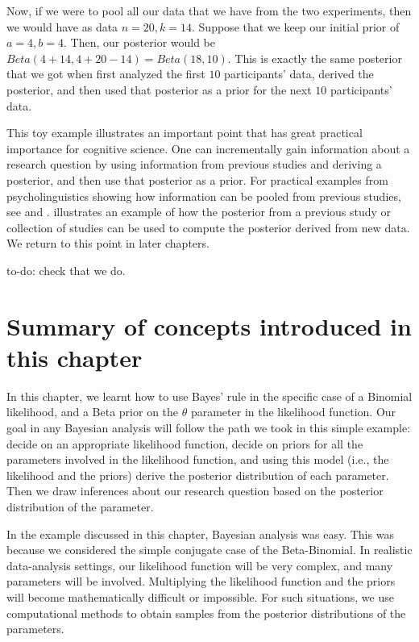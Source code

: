 \documentclass[12pt,]{krantz}
\makeatletter
\newenvironment{kframe}{%
\medskip{}
\setlength{\fboxsep}{.8em}
 \def\at@end@of@kframe{}%
 \ifinner\ifhmode%
  \def\at@end@of@kframe{\end{minipage}}%
  \begin{minipage}{\columnwidth}%
 \fi\fi%
 \def\FrameCommand##1{\hskip\@totalleftmargin \hskip-\fboxsep
 \colorbox{shadecolor}{##1}\hskip-\fboxsep
     \hskip-\linewidth \hskip-\@totalleftmargin \hskip\columnwidth}%
 \MakeFramed {\advance\hsize-\width
   \@totalleftmargin\z@ \linewidth\hsize
   \@setminipage}}%
 {\par\unskip\endMakeFramed%
 \at@end@of@kframe}
\newenvironment{rmdblock}[1]
  {
  \begin{itemize}
  \renewcommand{\labelitemi}{
    \raisebox{-.7\height}[0pt][0pt]{
      {\setkeys{Gin}{width=3em,keepaspectratio}\texttt{[image: images/\#1]}}
    }
  }
  \setlength{\fboxsep}{1em}
  \begin{kframe}
  \item
  }
  {
  \end{kframe}
  \end{itemize}
  }
\newenvironment{rmdnote}
  {\begin{rmdblock}{note}}
  {\end{rmdblock}}
\theoremstyle{definition}
\theoremstyle{definition}
\theoremstyle{definition}
\theoremstyle{remark}
\makeatother
\begin{document}
Now, if we were to pool all our data that we have from the two experiments, then we would have as data \(n=20, k=14\). Suppose that we keep our initial prior of \(a=4,b=4\). Then, our posterior would be \(Beta(4+14,4+20-14)=Beta(18,10)\). This is exactly the same posterior that we got when first analyzed the first \(10\) participants' data, derived the posterior, and then used that posterior as a prior for the next \(10\) participants' data.

This toy example illustrates an important point that has great practical importance for cognitive science. One can incrementally gain information about a research question by using information from previous studies and deriving a posterior, and then use that posterior as a prior. For practical examples from psycholinguistics showing how information can be pooled from previous studies, see \citet{JaegerEngelmannVasishth2017} and \citet{NicenboimRoettgeretal}. \citet{VasishthEngelmann2020} illustrates an example of how the posterior from a previous study or collection of studies can be used to compute the posterior derived from new data. We return to this point in later chapters.

\begin{rmdnote}
to-do: check that we do.
\end{rmdnote}

\hypertarget{summary-of-concepts-introduced-in-this-chapter-1}{%
\section{Summary of concepts introduced in this chapter}\label{summary-of-concepts-introduced-in-this-chapter-1}}

In this chapter, we learnt how to use Bayes' rule in the specific case of a Binomial likelihood, and a Beta prior on the \(\theta\) parameter in the likelihood function. Our goal in any Bayesian analysis will follow the path we took in this simple example: decide on an appropriate likelihood function, decide on priors for all the parameters involved in the likelihood function, and using this model (i.e., the likelihood and the priors) derive the posterior distribution of each parameter. Then we draw inferences about our research question based on the posterior distribution of the parameter.

In the example discussed in this chapter, Bayesian analysis was easy. This was because we considered the simple conjugate case of the Beta-Binomial. In realistic data-analysis settings, our likelihood function will be very complex, and many parameters will be involved. Multiplying the likelihood function and the priors will become mathematically difficult or impossible. For such situations, we use computational methods to obtain samples from the posterior distributions of the parameters.
\end{document}
